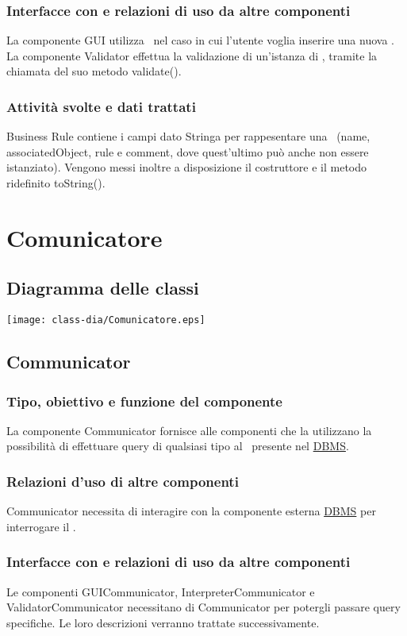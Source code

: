 \subsubsection{Interfacce con e relazioni di uso da altre componenti}
La componente GUI utilizza \BR\ nel caso in cui l'utente voglia inserire una nuova \br.
La componente Validator effettua la validazione di un'istanza di \BR, tramite la chiamata del suo metodo validate().
\subsubsection{Attivit\`a svolte e dati trattati}
Business Rule contiene i campi dato Stringa per rappesentare una \br\ (name, associatedObject, rule e comment, dove quest'ultimo pu\`o anche non essere istanziato). Vengono messi inoltre a disposizione il costruttore e il metodo ridefinito toString().

\section{Comunicatore}
\subsection{Diagramma delle classi}
\begin{center}
\texttt{[image: class-dia/Comunicatore.eps]}
\end{center}
\subsection{Communicator}
\subsubsection{Tipo, obiettivo e funzione del componente}
La componente Communicator fornisce alle componenti che la utilizzano la possibilit\`a di effettuare query di qualsiasi tipo al \rp\ presente nel \underline{DBMS}.
\subsubsection{Relazioni d'uso di altre componenti}
Communicator necessita di interagire con la componente esterna \underline{DBMS} per interrogare il \rp.
\subsubsection{Interfacce con e relazioni di uso da altre componenti}
Le componenti GUICommunicator, InterpreterCommunicator e ValidatorCommunicator necessitano di Communicator per potergli passare query specifiche. Le loro descrizioni verranno trattate successivamente.
